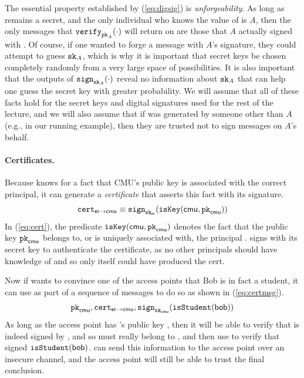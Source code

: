 \documentclass[11pt,twoside]{scrartcl}
\begin{document}
The essential property established by (\ref{eq:digsig}) is \emph{unforgeability}. As long as  remains a secret, and the only individual who knows the value of  is $A$, then the only messages that $\texttt{\upshape verify}_{\texttt{\upshape pk}_{A}}(\cdot)$ will return \strue on are those that $A$ actually signed with . Of course, if one wanted to forge a message with $A$'s signature, they could attempt to guess $\texttt{\upshape sk}_{A}$, which is why it is important that secret keys be chosen completely randomly from a very large space of possibilities. It is also important that the outputs of $\texttt{\upshape sign}_{\texttt{\upshape sk}_{A}}(\cdot)$ reveal no information about $\texttt{\upshape sk}_{A}$ that can help one guess the secret key with greater probability. We will assume that all of these facts hold for the secret keys and digital signatures used for the rest of the lecture, and we will also assume that if  was generated by someone other than $A$ (e.g., \eduroam in our running example), then they are trusted not to sign messages on $A$'s behalf.

\paragraph{Certificates.}
Because \eduroam knows for a fact that CMU's public key \pk{\cmu} is associated with the correct principal, it can generate a \emph{certificate} that asserts this fact with its signature.
\begin{equation}
\label{eq:cert}
\cert{\eduroam}{\cmu} \equiv \sign{\sk{\eduroam}}{\iskey{\cmu}{\pk{\cmu}}}
\end{equation}
In (\ref{eq:cert}), the predicate $\texttt{\upshape isKey}(\mathsf{cmu},\texttt{\upshape pk}_{\mathsf{cmu}})$ denotes the fact that the public key $\texttt{\upshape pk}_{\mathsf{cmu}}$ belongs to, or is uniquely associated with, the principal \cmu. \eduroam signs with its secret key \sk{\eduroam} to authenticate the certificate, as no other principals should have knowledge of \sk{\eduroam} and so only \eduroam itself could have produced the cert.

Now if \cmu wants to convince one of the access points that Bob is in fact a student, it can use \cert{\eduroam}{\cmu} as part of a sequence of messages to do so as shown in (\ref{eq:certmsg}).
\begin{equation}
\label{eq:certmsg}
\pk{\cmu}, \cert{\eduroam}{\cmu}, \sign{\sk{\cmu}}{\isstu(\tli)}
\end{equation}
As long as the access point has \eduroam's public key \pk{\eduroam}, then it will be able to verify that \cert{\eduroam}{\cmu} is indeed signed by \eduroam, and so \pk{\cmu} must really belong to \cmu, and then use \pk{\cmu} to verify that \cmu signed $\texttt{\upshape isStudent}(\mathsf{bob})$. \cmu can send this information to the access point over an insecure channel, and the access point will still be able to trust the final conclusion.
\end{document}
